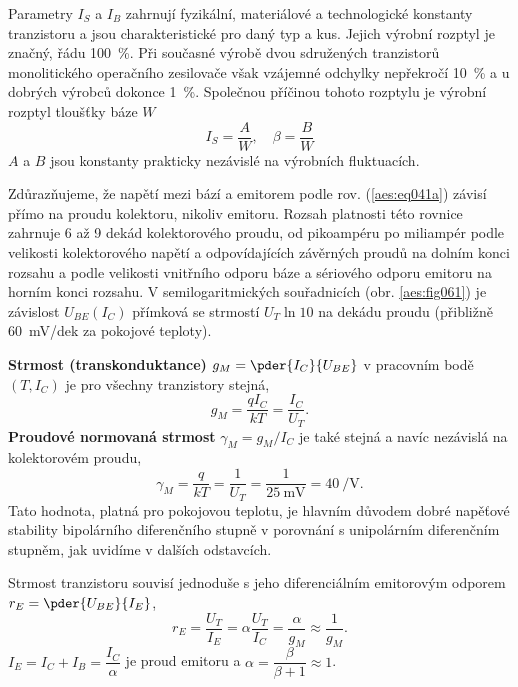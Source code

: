       Parametry \(I_S\) a \(I_B\) zahrnují fyzikální, materiálové a technologické konstanty
      tranzistoru a jsou charakteristické pro daný typ a kus. Jejich výrobní rozptyl je značný, řádu
      \SI{100}{\percent}. Při současné výrobě dvou sdružených tranzistorů monolitického operačního
      zesilovače však vzájemné odchylky nepřekročí \SI{10}{\percent} a u dobrých výrobců dokonce
      \SI{1}{\percent}.  Společnou příčinou tohoto rozptylu je výrobní rozptyl tloušťky báze \(W\)
      \begin{equation}\label{aes:eq042}
        I_S = \dfrac{A}{W}, \quad \beta = \dfrac{B}{W}
      \end{equation}   
      \(A\) a \(B\) jsou konstanty prakticky nezávislé na výrobních fluktuacích.

      Zdůrazňujeme, že napětí mezi bází a emitorem podle rov. (\ref{aes:eq041a}) závisí přímo na
      proudu kolektoru, nikoliv emitoru. Rozsah platnosti této rovnice zahrnuje 6 až 9 dekád
      kolektorového proudu, od pikoampéru po miliampér podle velikosti kolektorového napětí a
      odpovídajících závěrných proudů na dolním konci rozsahu a podle velikosti vnitřního odporu
      báze a sériového odporu emitoru na horním konci rozsahu. V semilogaritmických souřadnicích
      (obr. \ref{aes:fig061}) je závislost \(U_{BE}(I_C)\) přímková se strmostí \(U_T\ln10\) na
      dekádu proudu (přibližně \SI{60}{\mV}/dek za pokojové teploty).

      \textbf{Strmost (transkonduktance)} \(g_M = \pder{I_C}{U_{BE}}\) v pracovním bodě \((T, I_C)\)
      je pro všechny tranzistory stejná,
      \begin{equation}\label{aes:eq043}
        g_M = \dfrac{qI_C}{kT}  = \dfrac{I_C}{U_T}.
      \end{equation} 
      \textbf{Proudové normovaná strmost} \(\gamma_M = g_M/I_C\) je také stejná a navíc nezávislá
      na kolektorovém proudu,
      \begin{equation}\label{aes:eq044}
        \gamma_M = \dfrac{q}{kT}  = \dfrac{1}{U_T} = \dfrac{1}{\SI{25}{\mV}} = \SI{40}{\per\V}.
      \end{equation} 
      Tato hodnota, platná pro pokojovou teplotu, je hlavním důvodem dobré napěťové stability
      bipolárního diferenčního stupně v porovnání s unipolárním diferenčním stupněm, jak uvidíme v
      dalších odstavcích.

      Strmost tranzistoru souvisí jednoduše s jeho diferenciálním emitorovým odporem \(r_E =
      \pder{U_{BE}}{I_E}\),
      \begin{equation}\label{aes:eq045}
        r_E = \dfrac{U_T}{I_E}  = \alpha\dfrac{U_T}{I_C} 
            = \dfrac{\alpha}{g_M} \approx \dfrac{1}{g_M}.
      \end{equation} 
      \(I_E = I_C + I_B = \dfrac{I_C}{\alpha}\) je proud emitoru a \(\alpha = \dfrac{\beta}{\beta +
      1} \approx 1\).


